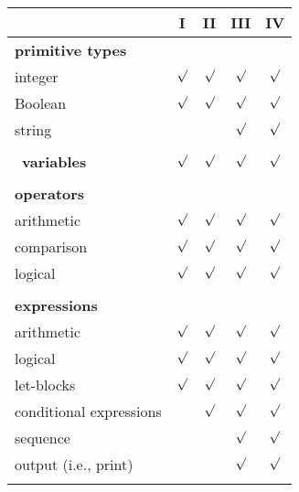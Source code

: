 \documentclass[submission,copyright,creativecommons]{eptcs}
\begin{document}
\begin{table*}[htb!]
\centering
\begin{tabular}{@{}lcccc@{}}\toprule
                                 & \textbf{I} & \textbf{II} & \textbf{III} & \textbf{IV} \\ \midrule
\multicolumn{5}{l}{\textbf{primitive types}} \\ \midrule
\qquad integer                   & $\surd$    & $\surd$     & $\surd$      & $\surd$     \\ \hline
\qquad Boolean                   & $\surd$    & $\surd$     & $\surd$      & $\surd$     \\ \hline
\qquad string                    &            &             & $\surd$      & $\surd$     \\ \hline
\multicolumn{5}{l}{} \\ \midrule
\ \textbf{variables}                        & $\surd$    &  $\surd$    & $\surd$      & $\surd$     \\ \midrule
\multicolumn{5}{l}{} \\
\multicolumn{5}{l}{\textbf{operators}} \\ \midrule
\qquad arithmetic                & $\surd$    &  $\surd$    & $\surd$      & $\surd$     \\ \hline
\qquad comparison                & $\surd$    &  $\surd$    & $\surd$      & $\surd$     \\ \hline
\qquad logical                   & $\surd$    &  $\surd$    & $\surd$      & $\surd$     \\ \hline
\multicolumn{5}{l}{} \\
\multicolumn{5}{l}{\textbf{expressions}} \\ \midrule
\qquad arithmetic                & $\surd$    &  $\surd$    & $\surd$      & $\surd$     \\ \hline
\qquad logical                   & $\surd$    &  $\surd$    & $\surd$      & $\surd$     \\ \hline
\qquad let-blocks                & $\surd$    &  $\surd$    & $\surd$      & $\surd$     \\ \hline
\qquad conditional expressions   &            &  $\surd$    & $\surd$      & $\surd$     \\ \hline
\qquad sequence                  &            &             & $\surd$      & $\surd$     \\ \hline
\qquad output (i.e., print)      &            &             & $\surd$      & $\surd$     \\ \hline
\multicolumn{5}{l}{} \\

\end{tabular}
\end{table*}
\end{document}
